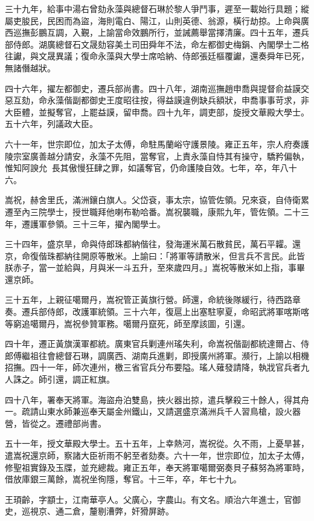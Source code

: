 \begin{pinyinscope}
三十九年，給事中湯右曾劾永藻與總督石琳於黎人爭鬥事，遲至一載始行具題；縱屬吏朘民，民困而為盜，海則電白、陽江，山則英德、翁源，橫行劫掠。上命與廣西巡撫彭鵬互調，入覲，上諭當命效鵬所行，並誡薦舉當擇清廉。四十五年，遷兵部侍郎。湖廣總督石文晟劾容美土司田舜年不法，命左都御史梅鋗、內閣學士二格往讞，與文晟異議；復命永藻與大學士席哈納、侍郎張廷樞覆讞，還奏舜年已死，無諸僭越狀。

四十六年，擢左都御史，遷兵部尚書。四十八年，湖南巡撫趙申喬與提督俞益謨交惡互劾，命永藻偕副都御史王度昭往按，得益謨違例缺兵額狀，申喬事事苛求，非大臣體，並擬奪官，上罷益謨，留申喬。四十九年，調吏部，旋授文華殿大學士。五十六年，列議政大臣。

六十一年，世宗即位，加太子太傅，命駐馬蘭峪守護景陵。雍正五年，宗人府奏護陵宗室廣善越分請安，永藻不先阻，當奪官，上責永藻自恃其有操守，驕矜偏執，惟知阿諛允，長其傲慢狂肆之罪，如議奪官，仍命護陵自效。七年，卒，年八十六。

嵩祝，赫舍里氏，滿洲鑲白旗人。父岱袞，事太宗，協管佐領。兄來袞，自侍衛累遷至內三院學士，授世職拜他喇布勒哈番。嵩祝襲職，康熙九年，管佐領。二十三年，遷護軍參領。三十三年，擢內閣學士。

三十四年，盛京旱，命與侍郎珠都納偕往，發海運米萬石散貧民，萬石平糶。還京，命復偕珠都納往開原等散米。上諭曰：「將軍等請散米，但言兵不言民。此皆朕赤子，當一並給與，月與米一斗五升，至來歲四月。」嵩祝等散米如上指，事畢還京師。

三十五年，上親征噶爾丹，嵩祝管正黃旗行營。師還，命統後隊緩行，待西路章奏。遷兵部侍郎，改護軍統領。三十六年，復扈上出塞駐寧夏，命昭武將軍喀斯喀等窮追噶爾丹，嵩祝參贊軍務。噶爾丹竄死，師至摩該圖，引還。

四十年，遷正黃旗漢軍都統。廣東官兵剿連州瑤失利，命嵩祝偕副都統達爾占、侍郎傅繼祖往會總督石琳，調廣西、湖南兵進剿，即授廣州將軍。瀕行，上諭以相機招撫。四十一年，師次連州，檄三省官兵分布要隘。瑤人薙發請降，執戕官兵者九人誅之。師引還，調正紅旗。

四十八年，署奉天將軍。海盜舟泊雙島，挾火器出掠，遣兵擊殺三十餘人，得其舟一。疏請山東水師兼巡奉天屬金州鐵山，又請選盛京滿洲兵千人習鳥槍，設火器營，皆從之。遷禮部尚書。

五十一年，授文華殿大學士。五十五年，上幸熱河，嵩祝從。久不雨，上憂旱甚，遣嵩祝還京師，察諸大臣祈雨不躬至者劾奏。六十一年，世宗即位，加太子太傅，修聖祖實錄及玉牒，並充總裁。雍正五年，奉天將軍噶爾弼奏貝子蘇努為將軍時，借放庫銀三萬餘，嵩祝坐徇隱，奪官。十三年，卒，年七十九。

王頊齡，字顓士，江南華亭人。父廣心，字農山。有文名。順治六年進士，官御史，巡視京、通二倉，釐剔漕弊，奸猾屏跡。


\end{pinyinscope}
